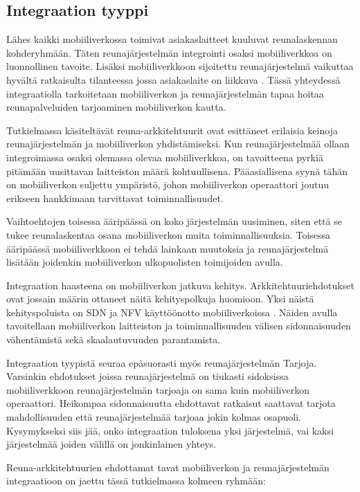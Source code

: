
\subsection{Integraation tyyppi} \label{integraatio}
Lähes kaikki mobiiliverkossa toimivat asiakaslaitteet kuuluvat reunalaskennan kohderyhmään.
Täten reunajärjestelmän integrointi osaksi mobiiliverkkoa on luonnollinen tavoite.
Lisäksi mobiiliverkkoon sijoitettu reunajärjestelmä vaikuttaa hyvältä ratkaisulta tilanteessa jossa asiakaslaite on liikkuva \cite{gusev2018going}.
Tässä yhteydessä integraatiolla tarkoitetaan mobiiliverkon ja reunajärjestelmän tapaa hoitaa reunapalveluiden tarjoaminen mobiiliverkon kautta.

Tutkielmassa käsiteltävät reuna-arkkitehtuurit ovat esittäneet erilaisia keinoja reunajärjestelmän ja mobiiliverkon yhdistämiseksi.
Kun reunajärjestelmää ollaan integroimassa osaksi olemassa olevaa mobiiliverkkoa, on tavoitteena pyrkiä pitämään uusittavan laitteiston määrä kohtuullisena. Pääasiallisena syynä tähän on mobiiliverkon suljettu ympäristö, johon mobiiliverkon operaattori joutuu erikseen hankkimaan tarvittavat toiminnallisuudet.

Vaihtoehtojen toisessa ääripäässä on koko järjestelmän uusiminen, siten että se tukee reunalaskentaa osana mobiiliverkon muita toiminnallisuuksia.
Toisessa ääripäässä mobiiliverkkoon ei tehdä lainkaan muutoksia ja reunajärjestelmä lisätään joidenkin mobiiliverkon ulkopuolisten toimijoiden avulla. 

Integraation haasteena on mobiiliverkon jatkuva kehitys. Arkkitehtuuriehdotukset ovat jossain määrin ottaneet näitä kehityspolkuja huomioon. 
Yksi näistä kehityspoluista on SDN ja NFV käyttöönotto mobiiliverkoissa \cite{heinonen2014dynamic, nfvwhite}. 
Näiden avulla tavoitellaan mobiiliverkon laitteiston ja toiminnallisuuden välisen sidonnaisuuden vähentämistä sekä skaalautuvuuden parantamista.

Integraation tyypistä seuraa epäsuorasti myös reunajärjestelmän Tarjoja.
Varsinkin ehdotukset joissa reunajärjestelmä on tiukasti sidoksissa mobiiliverkkoon reunajärjestelmän tarjoaja on sama kuin mobiiliverkon operaattori. Heikompaa sidonnaisuutta ehdottavat ratkaisut saattavat tarjota mahdollisuuden että reunajärjestelmää tarjoaa jokin kolmas osapuoli. Kysymykseksi siis jää, onko integraation tuloksena yksi järjestelmä, vai kaksi järjestelmää joiden välillä on jonkinlainen yhteys.

Reuna-arkkitehtuurien ehdottamat tavat mobiiliverkon ja reunajärjestelmän integraatioon on jaettu tässä tutkielmassa kolmeen ryhmään:

